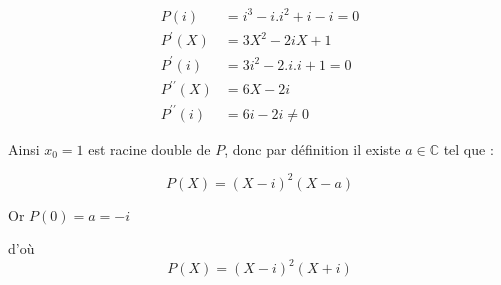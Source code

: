 {\begin{enumerate}
{\begin{align*}
P(i) & =i^3-i . i^2+i-i=0 \\
P^{\prime}(X) & =3 X^2-2 i X+1 \\
P^{\prime}(i) & =3 i^2-2 . i . i+1=0 \\
P^{\prime \prime}(X) & =6 X-2 i \\
P^{\prime \prime}(i) & =6 i-2 i \neq 0
\end{align*}

Ainsi $x_0=1$ est racine double de $P$, donc par définition il existe $a \in \mathbb{C}$ tel que :


$$P(X)=  (X-i)^2 (X-a)$$

Or $P(0) = a = -i$ 


d'où 
$$P(X) = (X-i)^2(X+i)$$ }

\end{enumerate}}
